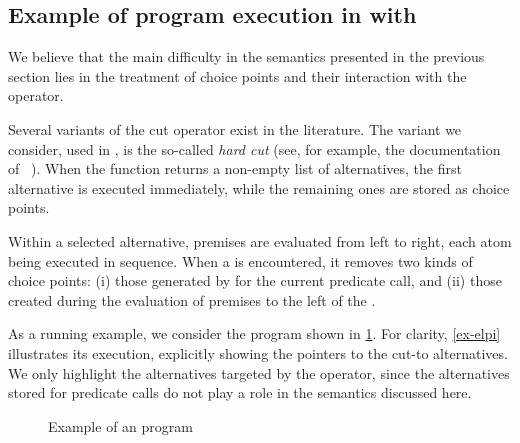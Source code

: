 \subsection{Example of program execution in \elpi with \cut}
\label{sec:elpi-execution-example}

We believe that the main difficulty in the semantics presented in the previous
section lies in the treatment of choice points and their interaction with the
\cut operator.

Several variants of the cut operator exist in the literature. The variant we
consider, used in \elpi, is the so-called \emph{hard cut} (see, for example, the
documentation of \sprolog~\cite{swi-prolog-cut}). When the 
function returns a non-empty list of alternatives, the first alternative is
executed immediately, while the remaining ones are stored as choice points.%

Within a selected alternative, premises are evaluated from left to right, each
atom being executed in sequence. When a \cut is encountered, it removes two
kinds of choice points: (i) those generated by  for the current
predicate call, and (ii) those created during the evaluation of premises to the
left of the \cut.

As a running example, we consider the program shown in \cref{fig:progx}. For
clarity, \cref{ex-elpi} illustrates its execution, explicitly showing the
pointers to the cut-to alternatives. We only highlight the alternatives targeted
by the \cut operator, since the alternatives stored for predicate calls do not
play a role in the semantics discussed here.


\begin{figure}[t]
  \begin{subfigure}{0.32\textwidth} 
     
  \end{subfigure}
  \begin{subfigure}{0.32\textwidth} 
     
  \end{subfigure}
  \begin{subfigure}{0.32\textwidth} 
     
  \end{subfigure}
  \caption{Example of an \elpi program}
  \label{fig:progx}
\end{figure}

